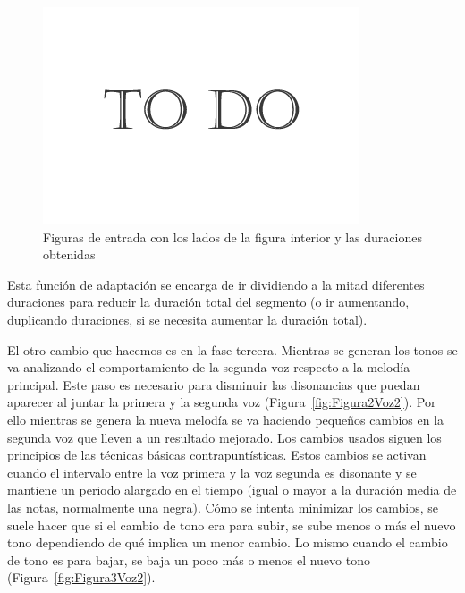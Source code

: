  		\begin{figure}[htbp]
		\centering
		\hspace*{0.0in}
		\includegraphics[scale=0.57]{graphics/todo.png}
		\caption{Figuras de entrada con los lados de la figura interior y las duraciones obtenidas}
		\label{fig:Figura1Voz2}
		\end{figure}

Esta función de adaptación se encarga de ir dividiendo a la mitad diferentes duraciones para reducir la duración total del segmento (o ir aumentando, duplicando duraciones, si se necesita aumentar la duración total). 

El otro cambio que hacemos es en la fase tercera. Mientras se generan los tonos se va analizando el comportamiento de la segunda voz respecto a la melodía principal. Este paso es necesario para disminuir las disonancias que puedan aparecer al juntar la primera y la segunda voz (Figura~\ref{fig:Figura2Voz2}). Por ello mientras se genera la nueva melodía se va haciendo pequeños cambios en la segunda voz que lleven a un resultado mejorado. Los cambios usados siguen los principios de las técnicas básicas contrapuntísticas. Estos cambios se activan cuando el intervalo entre la voz primera y la voz segunda es disonante y se mantiene un periodo alargado en el tiempo (igual o mayor a la duración media de las notas, normalmente una negra). Cómo se intenta minimizar los cambios, se suele hacer que si el cambio de tono era para subir, se sube menos o más el nuevo tono dependiendo de qué implica un menor cambio. Lo mismo cuando el cambio de tono es para bajar, se baja un poco más o menos el nuevo tono (Figura~\ref{fig:Figura3Voz2}).

